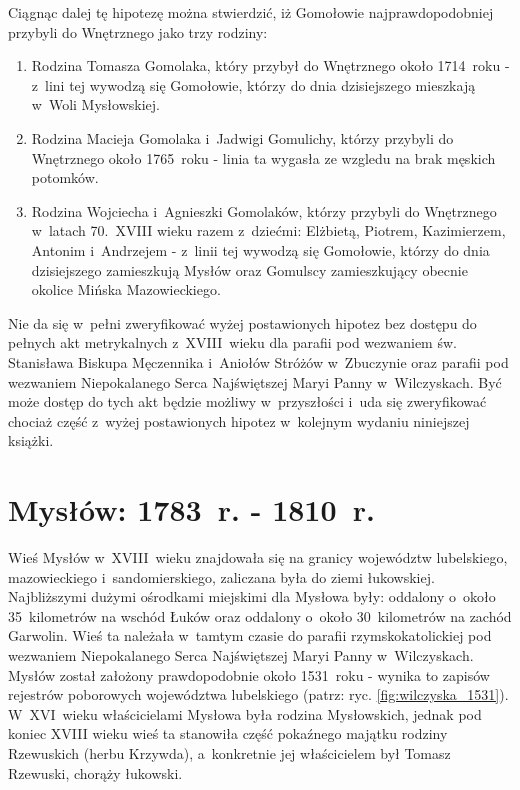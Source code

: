 Ciągnąc dalej tę hipotezę można stwierdzić, iż Gomołowie najprawdopodobniej 
przybyli do Wnętrznego jako trzy rodziny:

\begin{enumerate}
    \item Rodzina Tomasza Gomolaka, który przybył do Wnętrznego około 
    1714~roku - z~lini tej wywodzą się Gomołowie, którzy do dnia dzisiejszego 
    mieszkają w~Woli Mysłowskiej.
    \item Rodzina Macieja Gomolaka i~Jadwigi Gomulichy, którzy przybyli do 
    Wnętrznego około 1765~roku - linia ta wygasła ze wzgledu na brak 
    męskich potomków.
    \item Rodzina Wojciecha i~Agnieszki Gomolaków, którzy przybyli do 
    Wnętrznego w~latach 70.~XVIII wieku razem z~dziećmi: Elżbietą, Piotrem,
    Kazimierzem, Antonim i~Andrzejem - z~linii tej wywodzą się Gomołowie, 
    którzy do dnia dzisiejszego zamieszkują Mysłów oraz Gomulscy 
    zamieszkujący obecnie okolice Mińska Mazowieckiego.
\end{enumerate}

Nie da się w~pełni zweryfikować wyżej postawionych hipotez bez dostępu do 
pełnych akt metrykalnych z~XVIII~wieku dla parafii pod wezwaniem św. 
Stanisława Biskupa Męczennika i~Aniołów Stróżów w~Zbuczynie oraz parafii pod 
wezwaniem Niepokalanego Serca Najświętszej Maryi Panny w~Wilczyskach. Być może 
dostęp do tych akt będzie możliwy w~przyszłości i~uda się zweryfikować chociaż 
część z~wyżej postawionych hipotez w~kolejnym wydaniu niniejszej książki.

\clearpage


\section{Mysłów: 1783~r. - 1810~r.}

Wieś Mysłów w~XVIII~wieku znajdowała się na granicy województw lubelskiego, 
mazowieckiego i~sandomierskiego, zaliczana była do ziemi łukowskiej. 
Najbliższymi dużymi ośrodkami miejskimi dla Mysłowa były: oddalony 
o~około 35~kilometrów na wschód Łuków oraz oddalony o~około 30~kilometrów na 
zachód Garwolin. Wieś ta należała w~tamtym czasie do parafii 
rzymskokatolickiej pod wezwaniem Niepokalanego Serca Najświętszej Maryi Panny 
w~Wilczyskach. Mysłów został założony prawdopodobnie około 1531~roku - wynika 
to zapisów rejestrów poborowych województwa lubelskiego \cite{apawinski} 
(patrz: ryc. \ref{fig:wilczyska_1531}). W~XVI~wieku właścicielami Mysłowa 
była rodzina Mysłowskich, jednak pod koniec XVIII wieku wieś ta stanowiła 
część pokaźnego majątku rodziny Rzewuskich (herbu Krzywda), a~konkretnie jej 
właścicielem był Tomasz Rzewuski, chorąży łukowski. \nocite{sulimierski}

